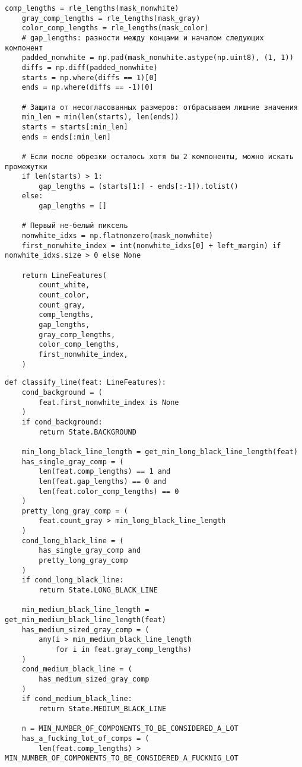 \begin{lstlisting}[caption={Функция для выделения характеристик строки пикселей (часть 2)}, label={lst:}]
    comp_lengths = rle_lengths(mask_nonwhite)
    gray_comp_lengths = rle_lengths(mask_gray)
    color_comp_lengths = rle_lengths(mask_color)
    # gap_lengths: разности между концами и началом следующих компонент
    padded_nonwhite = np.pad(mask_nonwhite.astype(np.uint8), (1, 1))
    diffs = np.diff(padded_nonwhite)
    starts = np.where(diffs == 1)[0]
    ends = np.where(diffs == -1)[0]

    # Защита от несогласованных размеров: отбрасываем лишние значения
    min_len = min(len(starts), len(ends))
    starts = starts[:min_len]
    ends = ends[:min_len]

    # Если после обрезки осталось хотя бы 2 компоненты, можно искать промежутки
    if len(starts) > 1:
        gap_lengths = (starts[1:] - ends[:-1]).tolist()
    else:
        gap_lengths = []

    # Первый не-белый пиксель
    nonwhite_idxs = np.flatnonzero(mask_nonwhite)
    first_nonwhite_index = int(nonwhite_idxs[0] + left_margin) if nonwhite_idxs.size > 0 else None

    return LineFeatures(
        count_white,
        count_color,
        count_gray,
        comp_lengths,
        gap_lengths,
        gray_comp_lengths,
        color_comp_lengths,
        first_nonwhite_index,
    )
\end{lstlisting}

\newpage

\begin{lstlisting}[caption={Функция классификации строки (часть 1)}, label={lst:classify_line}]
def classify_line(feat: LineFeatures):
    cond_background = (
        feat.first_nonwhite_index is None
    )
    if cond_background:
        return State.BACKGROUND

    min_long_black_line_length = get_min_long_black_line_length(feat)
    has_single_gray_comp = (
        len(feat.comp_lengths) == 1 and
        len(feat.gap_lengths) == 0 and
        len(feat.color_comp_lengths) == 0
    )
    pretty_long_gray_comp = (
        feat.count_gray > min_long_black_line_length
    )
    cond_long_black_line = (
        has_single_gray_comp and
        pretty_long_gray_comp
    )
    if cond_long_black_line:
        return State.LONG_BLACK_LINE

    min_medium_black_line_length = get_min_medium_black_line_length(feat)
    has_medium_sized_gray_comp = (
        any(i > min_medium_black_line_length
            for i in feat.gray_comp_lengths)
    )
    cond_medium_black_line = (
        has_medium_sized_gray_comp
    )
    if cond_medium_black_line:
        return State.MEDIUM_BLACK_LINE

    n = MIN_NUMBER_OF_COMPONENTS_TO_BE_CONSIDERED_A_LOT
    has_a_fucking_lot_of_comps = (
        len(feat.comp_lengths) > MIN_NUMBER_OF_COMPONENTS_TO_BE_CONSIDERED_A_FUCKNIG_LOT
\end{lstlisting}

